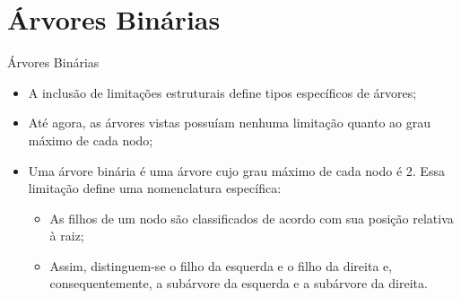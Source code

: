 \documentclass[12pt,table,xcolor={dvipsnames}]{beamer}
\begin{document}
\section{Árvores Binárias}

\begin{frame}[fragile]{Árvores Binárias}
          \begin{itemize}
          \item A inclusão de limitações estruturais define tipos específicos de árvores;
          \item Até agora, as árvores vistas possuíam nenhuma limitação quanto ao grau máximo de cada nodo;
          \item Uma árvore binária é uma árvore cujo grau máximo de cada nodo é 2. Essa limitação define uma nomenclatura específica: 
          \begin{itemize}
          \item As filhos de um nodo são classificados de acordo com sua posição relativa à raiz; 
          \item Assim, distinguem-se o filho da esquerda e o filho da direita e, consequentemente, a subárvore da esquerda e a subárvore da direita.         
          \end{itemize}
          \end{itemize}
\end{frame} 
\end{document}
